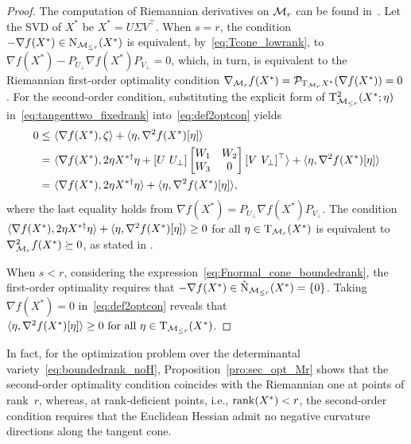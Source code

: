 \begin{proof}
    The computation of Riemannian derivatives on $\mathcal{M}_{r}$ can be found in~\cite[\S7.5]{boumal2023introduction}. Let the SVD of $X^*$ be $X^*=U\varSigma V^\top$. When $s = r$, the condition $-\nabla f(X^*) \in \mathrm{N}_{\mathcal{M}_{\le r}}(X^*)$ is equivalent, by~\eqref{eq:Tcone_lowrank}, to $\nabla f(X^*)-P_{U_\bot}\nabla f(X^*)P_{V_\bot}=0$, which, in turn, is equivalent to the Riemannian first-order optimality condition $\nabla_{\mathcal{M}_{r}} f(X^*)=\mathcal{P}_{\mathrm{T}_{\mathcal{M}_{r}}X^*}(\nabla f(X^*))=0$. For the second-order condition, substituting the explicit form of $\mathrm{T}^2_{\mathcal{M}_{\le r}}(X^*;\eta)$ in~\eqref{eq:tangenttwo_fixedrank} into~\eqref{eq:def2optcon} yields
    \begin{equation*}
        \begin{aligned}
           0\le &\ \innerp{\nabla f(X^*),\zeta}+\innerp{\eta,\nabla^2 f(X^*)[\eta]} 
            \\
            =&\ \innerp{\nabla f(X^*),2\eta X^{*\dagger}\eta + [U\ U_{\bot}]\left[ \begin{matrix}
                W_1&		W_2\\
                W_3&		0\\
            \end{matrix} \right][V\ V_{\bot}]^\top} + \innerp{\eta,\nabla^2 f(X^*)[\eta]}
            \\
            =&\ \innerp{\nabla f(X^*),2\eta X^{*\dagger}\eta} + \innerp{\eta,\nabla^2 f(X^*)[\eta]},
        \end{aligned}
    \end{equation*}
    where the last equality holds from $\nabla f(X^*)=P_{U_\bot}\nabla f(X^*)P_{V_\bot}$. The condition $\langle {\nabla f(X^*),2\eta X^{*\dagger}\eta} \rangle + \langle {\eta,\nabla^2 f(X^*)[\eta]} \rangle\ge 0$ for all $\eta\in\mathrm{T}_{\mathcal{M}_{r}}(X^*)$ is equivalent to $\nabla^2_{\mathcal{M}_{r}} f(X^*)\succeq 0$, as stated in \cite[\S 7.5]{boumal2023introduction}.

    When $s<r$, considering the expression~\eqref{eq:Fnormal_cone_boundedrank}, the first-order optimality requires that $-\nabla f(X^*)\in\hat{\mathrm{N}}_{\mathcal{M}_{\le r}}(X^*)=\{0\}$. Taking $\nabla f(X^*)=0$ in~\eqref{eq:def2optcon} reveals that $\langle {\eta,\nabla^2 f(X^*)[\eta]} \rangle\ge 0\ \text{for all}\ \eta\in\mathrm{T}_{\mathcal{M}_{\le r}}(X^*)$.
\end{proof}

In fact, for the optimization problem over the determinantal variety~\eqref{eq:boundedrank_noH}, Proposition~\ref{pro:sec_opt_Mr} shows that the second-order optimality condition coincides with the Riemannian one at points of rank~$r$, whereas, at rank-deficient points, i.e., $\operatorname{rank}(X^*)<r$, the second-order condition requires that the Euclidean Hessian admit no negative curvature directions along the tangent cone.

